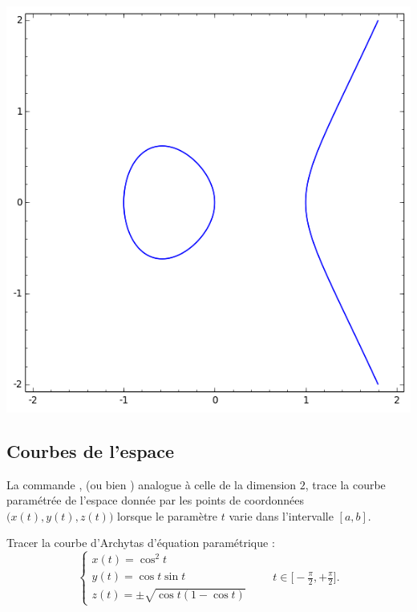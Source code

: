 \documentclass[class=report,crop=false]{standalone}
\begin{document}
\begin{center}
\includegraphics[scale=0.3]{figures/elliptic3}
\end{center}



\subsection{Courbes de l'espace}



La commande , 
(ou bien ) analogue à celle de la dimension $2$, 
trace la courbe paramétrée de 
l'espace donnée par les points de coordonnées $\big( x(t), y(t), z(t) \big)$ 
lorsque le paramètre $t$ varie dans l'intervalle $[a,b]$. 

\begin{tp}
Tracer la courbe d'Archytas d'équation paramétrique :
$$\left\{
\begin{array}{l}
x(t) = \cos^2 t \\[1mm]
y(t) = \cos t \sin t \\[1mm]
z(t) = \pm\sqrt{ \cos t(1-\cos t) }
\end{array}
\right.\qquad  t \in \big[-\tfrac\pi2,+\tfrac\pi2\big].$$
\end{tp}
\end{document}

